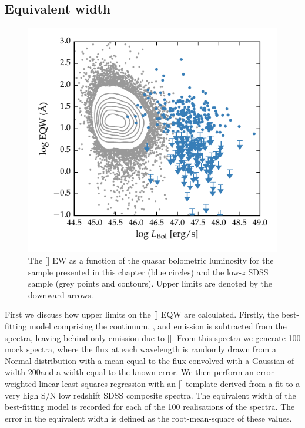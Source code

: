 \subsection{Equivalent width}

\begin{figure}
    \includegraphics[width=\columnwidth]{figures/chapter04/eqw_lum.pdf} 
    \caption{The [] EW as a function of the quasar bolometric luminosity for the sample presented in this chapter (blue circles) and the low-$z$ SDSS sample (grey points and contours). Upper limits are denoted by the downward arrows.}     
    \label{fig:eqw_lum}
\end{figure}

First we discuss how upper limits on the [] \ac{EQW} are calculated.
Firstly, the best-fitting model comprising the continuum, , and \hb emission is subtracted from the spectra, leaving behind only emission due to []. 
From this spectra we generate 100 mock spectra, where the flux at each wavelength is randomly drawn from a Normal distribution with a mean equal to the flux convolved with a Gaussian of width 200\kms and a width equal to the known error. 
We then perform an error-weighted linear least-squares regression with an [] template derived from a fit to a very high \ac{S/N} low redshift SDSS composite spectra. 
The equivalent width of the best-fitting model is recorded for each of the 100 realisations of the spectra. 
The error in the equivalent width is defined as the root-mean-square of these values.

